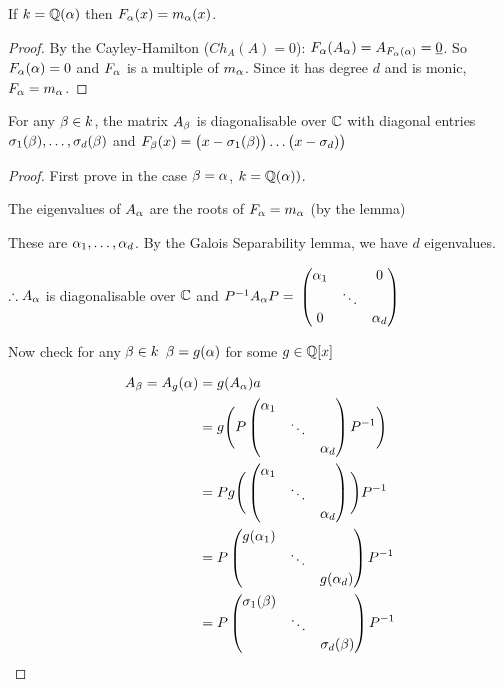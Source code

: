 \documentclass[11pt]{article}
\begin{document}
\begin{lemma}
	If $k= \mathbb{Q}(\alpha)$ then $F_\alpha(x) = m_\alpha(x)$.
\end{lemma}

\begin{proof}
	By the Cayley-Hamilton ($Ch_A(A) = 0$): $F_\alpha(A_\alpha) = A_{F_\alpha(\alpha)} = \underline{0}$.
	So $ F_\alpha(\alpha) = 0$ and $F_\alpha$ is a multiple of $m_\alpha$.
	Since it has degree $d$ and is monic, $F_\alpha = m_\alpha$.
\end{proof}

\begin{theorem}
	For any $\beta \in k$, the matrix $A_\beta$ is diagonalisable over $\mathbb{C}$ with diagonal entries $\sigma_1(\beta), \dots, \sigma_d(\beta)$ and $F_\beta(x) = \big(x-\sigma_1(\beta)\big) \dots \big(x-\sigma_d)\big)$
\end{theorem}
\begin{proof}
	First prove in the case $\beta = \alpha$, $k = \mathbb{Q}(\alpha))$.

	The eigenvalues of $A_\alpha$ are the roots of $F_\alpha = m_\alpha$ (by the lemma)
	\spa

	These are $\alpha_1, \dots, \alpha_d$.
	By the Galois Separability lemma, we have $d $ eigenvalues.
	\spa

	$\therefore A_\alpha$ is diagonalisable over $\mathbb{C}$ and $P^{-1} A_\alpha P =$ 
	$
	\begin{pmatrix}
		\alpha_1 & &0\\
		 &\ddots &  \\
		0 && \alpha_d
	\end{pmatrix}
	$
	\spa

	Now check for any $\beta \in k $ \hspace{7pt} $\beta=g(\alpha)$ for some $g \in \mathbb{Q}[x]$

	\begin{align*}
	A_\beta = A_g(\alpha) &= g(A_\alpha)a\\
		&= g \Bigg( P
		\begin{pmatrix}
			\alpha_1 & &\\
			& \ddots &\\
			&&\alpha_d
		\end{pmatrix}
		P^{-1}
		\Bigg)\\
		&= P g\Bigg(
		\begin{pmatrix}
			\alpha_1 & &\\
			& \ddots &\\
			&&\alpha_d
		\end{pmatrix}
		\Bigg) P^{-1}\\
		& = P
		\begin{pmatrix}
			g(\alpha_1) & &\\
			& \ddots &\\
			&&g(\alpha_d)
		\end{pmatrix}
		P^{-1} \\
		&= P
		\begin{pmatrix}
			\sigma_1(\beta) & &\\
			& \ddots &\\
			&&\sigma_d(\beta)
		\end{pmatrix}
		P^{-1}
	\end{align*}
\end{proof}
\spa
\end{document}
